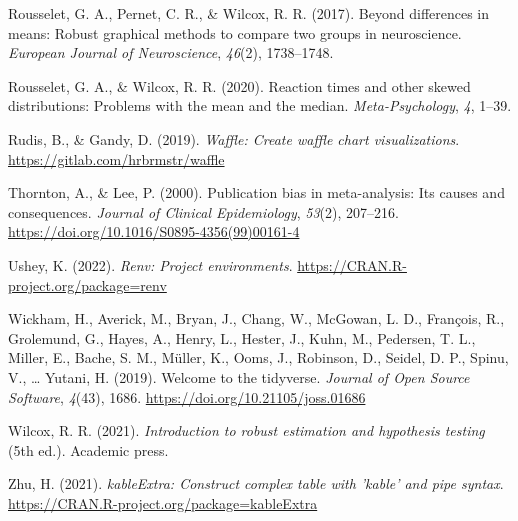 \documentclass[
  man, donotrepeattitle,mask,floatsintext]{apa7}
\newlength{\cslhangindent}
\newlength{\cslentryspacingunit} %
\newenvironment{CSLReferences}[2] %
 {%
  \setlength{\parindent}{0pt}
  \ifodd #1
  \let\oldpar\par
  \def\par{\hangindent=\cslhangindent\oldpar}
  \fi
  \setlength{\parskip}{#2\cslentryspacingunit}
 }%
 {}
\begin{document}
\begin{CSLReferences}{1}{0}
\leavevmode{}%
Rousselet, G. A., Pernet, C. R., \& Wilcox, R. R. (2017). Beyond differences in means: Robust graphical methods to compare two groups in neuroscience. \emph{European Journal of Neuroscience}, \emph{46}(2), 1738--1748.

\leavevmode{}%
Rousselet, G. A., \& Wilcox, R. R. (2020). Reaction times and other skewed distributions: Problems with the mean and the median. \emph{Meta-Psychology}, \emph{4}, 1--39.

\leavevmode{}%
Rudis, B., \& Gandy, D. (2019). \emph{Waffle: Create waffle chart visualizations}. \url{https://gitlab.com/hrbrmstr/waffle}

\leavevmode{}%
Thornton, A., \& Lee, P. (2000). Publication bias in meta-analysis: Its causes and consequences. \emph{Journal of Clinical Epidemiology}, \emph{53}(2), 207--216. \url{https://doi.org/10.1016/S0895-4356(99)00161-4}

\leavevmode{}%
Ushey, K. (2022). \emph{Renv: Project environments}. \url{https://CRAN.R-project.org/package=renv}

\leavevmode{}%
Wickham, H., Averick, M., Bryan, J., Chang, W., McGowan, L. D., François, R., Grolemund, G., Hayes, A., Henry, L., Hester, J., Kuhn, M., Pedersen, T. L., Miller, E., Bache, S. M., Müller, K., Ooms, J., Robinson, D., Seidel, D. P., Spinu, V., \ldots{} Yutani, H. (2019). Welcome to the {tidyverse}. \emph{Journal of Open Source Software}, \emph{4}(43), 1686. \url{https://doi.org/10.21105/joss.01686}

\leavevmode{}%
Wilcox, R. R. (2021). \emph{Introduction to robust estimation and hypothesis testing} (5th ed.). Academic press.

\leavevmode{}%
Zhu, H. (2021). \emph{kableExtra: Construct complex table with 'kable' and pipe syntax}. \url{https://CRAN.R-project.org/package=kableExtra}

\end{CSLReferences}
\end{document}
